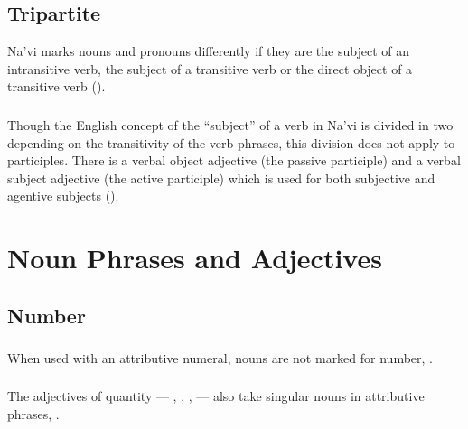 \subsection{Tripartite} Na'vi marks nouns and pronouns differently if
they are the subject of an intransitive verb, the subject of a
transitive verb or the direct object of a transitive verb
().

\subsubsection{} Though the English concept of the ``subject'' of a
verb in Na'vi is divided in two de\-pend\-ing on the transitivity of
the verb phrases, this division does not apply to participles.  There
is a verbal object adjective (the passive participle) and a verbal
subject adjective (the active participle) which is used for both
subjective and agentive subjects ().

\subsubsection{} 


\section{Noun Phrases and Adjectives}

\subsection{Number} 

\subsubsection{} When used with an attributive numeral, nouns are not
marked for number,  .

\subsubsection{} The adjectives of quantity ---  ,
 ,  ,   --- also take singular nouns in attributive phrases,  .

